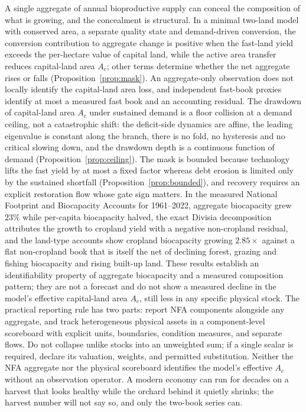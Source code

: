 A single aggregate of annual bioproductive supply can conceal the composition of what is growing, and the concealment is structural. In a minimal two-land model with conserved area, a separate quality state and demand-driven conversion, the conversion contribution to aggregate change is positive when the fast-land yield exceeds the per-hectare value of capital land, while the active area transfer reduces capital-land area $A_c$; other terms determine whether the net aggregate rises or falls (Proposition~\ref{prop:mask}). An aggregate-only observation does not locally identify the capital-land area loss, and independent fast-book proxies identify at most a measured fast book and an accounting residual. The drawdown of capital-land area $A_c$ under sustained demand is a floor collision at a demand ceiling, not a catastrophic shift: the deficit-side dynamics are affine, the leading eigenvalue is constant along the branch, there is no fold, no hysteresis and no critical slowing down, and the drawdown depth is a continuous function of demand (Proposition~\ref{prop:ceiling}). The mask is bounded because technology lifts the fast yield by at most a fixed factor whereas debt erosion is limited only by the sustained shortfall (Proposition~\ref{prop:bounded}), and recovery requires an explicit restoration flow whose gate sign matters. In the measured National Footprint and Biocapacity Accounts for 1961--2022, aggregate biocapacity grew $23\%$ while per-capita biocapacity halved, the exact Divisia decomposition attributes the growth to cropland yield with a negative non-cropland residual, and the land-type accounts show cropland biocapacity growing $2.85\times$ against a flat non-cropland book that is itself the net of declining forest, grazing and fishing biocapacity and rising built-up land. These results establish an identifiability property of aggregate biocapacity and a measured composition pattern; they are not a forecast and do not show a measured decline in the model's effective capital-land area $A_c$, still less in any specific physical stock. The practical reporting rule has two parts: report NFA components alongside any aggregate, and track heterogeneous physical assets in a component-level scoreboard with explicit units, boundaries, condition measures, and separate flows. Do not collapse unlike stocks into an unweighted sum; if a single scalar is required, declare its valuation, weights, and permitted substitution. Neither the NFA aggregate nor the physical scoreboard identifies the model's effective $A_c$ without an observation operator. A modern economy can run for decades on a harvest that looks healthy while the orchard behind it quietly shrinks; the harvest number will not say so, and only the two-book series can.

